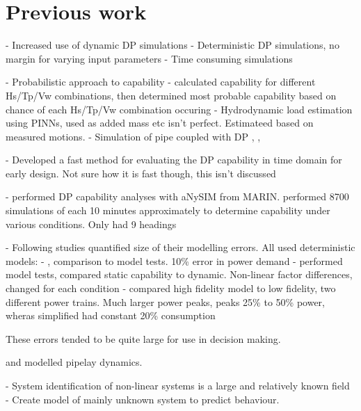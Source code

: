 
\section{Previous work}
 - Increased use of dynamic DP simulations
 - Deterministic DP simulations, no margin for varying input parameters 
 - Time consuming simulations

 - Probabilistic approach to capability - calculated capability for different Hs/Tp/Vw combinations, then determined most probable capability based on chance of each Hs/Tp/Vw combination occuring \cite{mauroProbabilisticApproachDynamic2022}
 - Hydrodynamic load estimation using PINNs, used as added mass etc isn't perfect. Estimateed based on measured motions. \cite{dingHydrodynamicsIdentificationDynamic2025}
 - Simulation of pipe coupled with DP \cite{aiModelingSimulationDeepwater2018}, \cite{armaogluAdvantagesUsingTimeDomain2014}, \cite{li-pingCouplingTimeDomainAnalysis2014}
 
 - Developed a fast method for evaluating the DP capability in time domain for early design. Not sure how it is fast though, this isn't discussed \cite{luebckeFastMethodEvaluation2015}

 - \cite{serrarisDPStationkeepingAccuracy} performed DP capability analyses with aNySIM from MARIN. performed 8700 simulations of each 10 minutes approximately to determine capability under various conditions. Only had 9 headings

 - Following studies quantified size of their modelling errors. All used deterministic models:
    - \cite{borhaugExperimentalValidationDynamic2012}, comparison to model tests. 10\% error in power demand
    - \cite{martelliTimedomainMethodologyAssess2022} performed model tests, compared static capability to dynamic. Non-linear factor differences, changed for each condition
    - \cite{donnarummaNUMERICALMODELSSHIP2015} compared high fidelity model to low fidelity, two different power trains. Much larger power peaks, peaks 25\% to 50\% power, wheras simplified had constant 20\% consumption

 These errors tended to be quite large for use in decision making.

\cite{hopPipeIntegrityPipelay2024} and \cite{devriesEfficientModellingOffshore2020} modelled pipelay dynamics. 

- System identification of non-linear systems is a large and relatively known field
    - Create model of mainly unknown system to predict behaviour.


